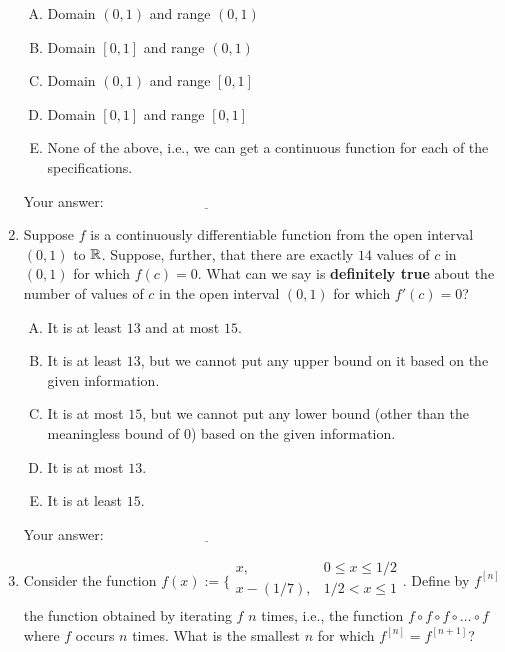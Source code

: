 \documentclass[10pt]{amsart}
\begin{document}
\begin{enumerate}
  \begin{enumerate}[(A)]
  \item Domain $(0,1)$ and range $(0,1)$
  \item Domain $[0,1]$ and range $(0,1)$
  \item Domain $(0,1)$ and range $[0,1]$
  \item Domain $[0,1]$ and range $[0,1]$
  \item None of the above, i.e., we can get a continuous function for
    each of the specifications.
  \end{enumerate}

  \vspace{0.05in}
  Your answer: $\underline{\qquad\qquad\qquad\qquad\qquad\qquad\qquad}$
  \vspace{0.05in}

\item Suppose $f$ is a continuously differentiable function from the
  open interval $(0,1)$ to $\mathbb{R}$. Suppose, further, that there are
  exactly $14$ values of $c$ in $(0,1)$ for which $f(c) = 0$. What can
  we say is {\bf definitely true} about the number of values of $c$ in
  the open interval $(0,1)$ for which $f'(c) = 0$? 

  \begin{enumerate}[(A)]
  \item It is at least $13$ and at most $15$.
  \item It is at least $13$, but we cannot put any upper bound on it
    based on the given information.
  \item It is at most $15$, but we cannot put any lower bound (other
  than the meaningless bound of $0$) based on the given information.
  \item It is at most $13$.
  \item It is at least $15$.
  \end{enumerate}

  \vspace{0.05in}
  Your answer: $\underline{\qquad\qquad\qquad\qquad\qquad\qquad\qquad}$
  \vspace{0.05in}
  
\item Consider the function $f(x) := \lbrace\begin{array}{rl} x, & 0
  \le x \le 1/2 \\ x - (1/7), & 1/2 < x \le 1 \\\end{array}$. Define by
  $f^{[n]}$ the function obtained by iterating $f$ $n$ times, i.e.,
  the function $f \circ f \circ f \circ \dots \circ f$ where $f$
  occurs $n$ times. What is the smallest $n$ for which $f^{[n]} =
  f^{[n + 1]}$? 


\end{enumerate}
\end{document}
